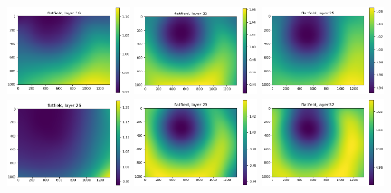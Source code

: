 \documentclass[letterpaper,11pt]{article}
\begin{document}
\begin{figure}[!ht]
\includegraphics[width=0.32\textwidth]{images/methods/flatfield_layers_vectra/flatfield_layer_19}
\includegraphics[width=0.32\textwidth]{images/methods/flatfield_layers_vectra/flatfield_layer_22}
\includegraphics[width=0.32\textwidth]{images/methods/flatfield_layers_vectra/flatfield_layer_25}
\includegraphics[width=0.32\textwidth]{images/methods/flatfield_layers_vectra/flatfield_layer_26}
\includegraphics[width=0.32\textwidth]{images/methods/flatfield_layers_vectra/flatfield_layer_29}
\includegraphics[width=0.32\textwidth]{images/methods/flatfield_layers_vectra/flatfield_layer_32}

\end{figure}
\end{document}
